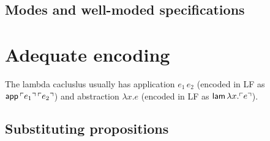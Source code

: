 \subsection{Modes and well-moded specifications}
\label{sec:framework-modes}

\section{Adequate encoding}

The lambda
cacluslus usually has application $e_1\,e_2$ (encoded in LF as ${\sf
  app}\,{\ulcorner{e_1}\urcorner}\,{\ulcorner{e_2}\urcorner}$) and abstraction $\lambda x.e$
(encoded in LF as ${\sf lam}\,\lambda x. {\ulcorner{e}\urcorner}$). 

\subsection{Substituting propositions}
\label{sec:framework-substprop}


